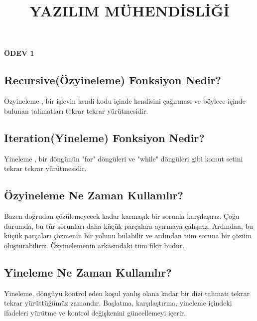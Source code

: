 \documentclass[12pt]{article} %
\begin{document}
\title{\Huge{\textbf{YAZILIM MÜHENDİSLİĞİ}}}

\maketitle\centering\textbf{\Huge{ÖDEV 1}}


\vspace{2cm}

\vspace{0.5cm}
\thispagestyle{empty}


\newpage
\begin{flushleft}
\section*{Recursive(Özyineleme) Fonksiyon Nedir?}
\textsf{Özyineleme , bir işlevin kendi kodu içinde kendisini çağırması ve böylece içinde bulunan talimatları tekrar tekrar yürütmesidir. }
\end{flushleft}

\begin{flushleft}
\section*{Iteration(Yineleme) Fonksiyon Nedir?}
\textsf{Yineleme , bir döngünün "for" döngüleri ve "while" döngüleri gibi komut setini tekrar tekrar yürütmesidir.}
\end{flushleft}


\begin{flushleft}
\section*{Özyineleme Ne Zaman Kullanılır?}
\textsf{Bazen doğrudan çözülemeyecek kadar karmaşık bir sorunla karşılaşırız. Çoğu durumda, bu tür sorunları daha küçük parçalara ayırmaya çalışırız. Ardından, bu küçük parçaları çözmenin bir yolunu bulabilir ve ardından tüm soruna bir çözüm oluşturabiliriz. Özyinelemenin arkasındaki tüm fikir budur.}
\end{flushleft}

\begin{flushleft}
\section*{Yineleme Ne Zaman Kullanılır?}
\textsf{Yineleme, döngüyü kontrol eden koşul yanlış olana kadar bir dizi talimatı tekrar tekrar yürüttüğümüz zamandır. Başlatma, karşılaştırma, yineleme içindeki ifadeleri yürütme ve kontrol değişkenini güncellemeyi içerir.}
\end{flushleft}
\end{document}

